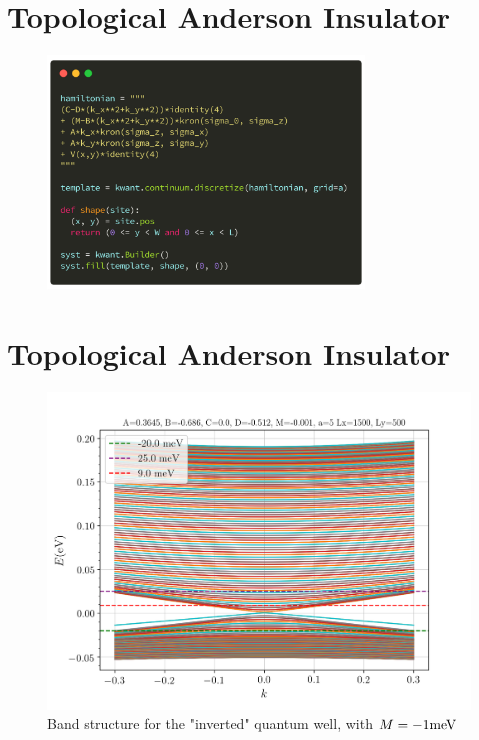 \documentclass[12pt]{article}
\numberwithin{equation}{section}
\begin{document}
\newpage
\section*{Topological Anderson Insulator}
\begin{figure}[h!]
    \begin{center}
        \includegraphics[width=0.75\textwidth]{./media/hamilton_def.png}
    \end{center}
\end{figure}

\newpage
\section*{Topological Anderson Insulator}
\begin{figure}[h!]
    \begin{center}
        \includegraphics[height=0.75\textheight]{./media/bstructure_params_Lx=1500_Ly=500_M=-0_001.png}
    \end{center}
    \caption{Band structure for the "inverted" quantum well, with $M=-1\textnormal{meV}$}
\end{figure}
\end{document}
